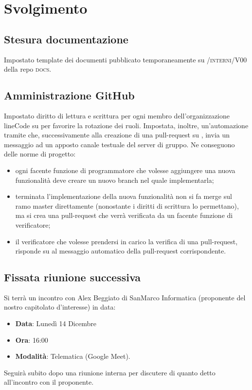 \documentclass[]{article}
\begin{document}
	\newpage

	\section{Svolgimento}
		\subsection{Stesura documentazione}
		Impostato template dei documenti pubblicato temporaneamente su \textsc{/interni/V00} della repo \textsc{docs}.

		\subsection{Amministrazione GitHub}
		Impostato diritto di lettura e scrittura per ogni membro dell'organizzazione lineCode su  per favorire la rotazione dei ruoli. Impostata, inoltre, un'automazione tramite  che, successivamente alla creazione di una pull-request su , invia un messaggio ad un apposto canale testuale del server  di gruppo. Ne conseguono delle norme di progetto:
		\begin{itemize}
			\item ogni facente funzione di programmatore che volesse aggiungere una nuova funzionalità deve creare un nuovo branch nel quale implementarla;
			\item terminata l'implementazione della nuova funzionalità non si fa merge sul ramo master direttamente (nonostante i diritti di scrittura lo permettano), ma si crea una pull-request che verrà verificata da un facente funzione di verificatore;
			\item il verificatore che volesse prendersi in carico la verifica di una pull-request, risponde su  al messaggio automatico della pull-request corrispondente.
		\end{itemize}

		\subsection{Fissata riunione successiva}
		Si terrà un incontro con Alex Beggiato di SanMarco Informatica (proponente del nostro capitolato d'interesse) in data:
		\begin{itemize}
			\item \textbf{Data}: Lunedì 14 Dicembre
			\item \textbf{Ora}: 16:00
			\item \textbf{Modalità}: Telematica (Google Meet).
		\end{itemize}
		Seguirà subito dopo una riunione interna per discutere di quanto detto all'incontro con il proponente.
\end{document}
